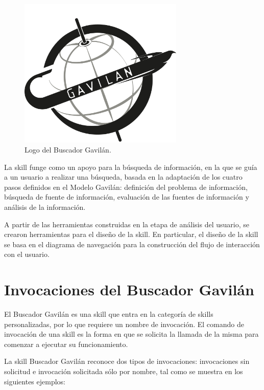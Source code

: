 \begin{figure}
  \centering
  \includegraphics[width=0.70\textwidth]{Cap4/Figuras/LogoSkill.png}
  \caption{Logo del Buscador Gavilán.}
  \label{fig:423}
\end{figure}

La skill funge como un apoyo para la búsqueda de información, en la que se guía a un usuario a realizar una búsqueda, basada en la adaptación de los cuatro pasos definidos en el Modelo Gavilán: definición del problema de información, búsqueda de fuente de información, evaluación de las fuentes de información y análisis de la información.

A partir de las herramientas construidas en la etapa de análisis del usuario, se crearon herramientas para el diseño de la skill. En particular, el diseño de la skill se basa en el diagrama de navegación para la construcción del flujo de interacción con el usuario.


\section{Invocaciones del Buscador Gavilán}
\label{InvocacionesBuscadorGavilancapIV}

El Buscador Gavilán es una skill que entra en la categoría de skills personalizadas, por lo que requiere un nombre de invocación. El comando de invocación de una skill es la forma en que se solicita la llamada de la misma para comenzar a ejecutar su funcionamiento.

La skill Buscador Gavilán reconoce dos tipos de invocaciones: invocaciones sin solicitud e invocación solicitada sólo por nombre, tal como se muestra en los siguientes ejemplos:

